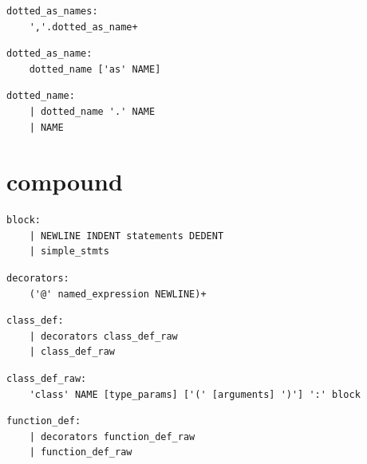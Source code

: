 \noindent\textbf{\texttt{}}\par
\begin{lstlisting}
dotted_as_names:
    ','.dotted_as_name+
\end{lstlisting}

\noindent\textbf{\texttt{}}\par
\begin{lstlisting}
dotted_as_name:
    dotted_name ['as' NAME]
\end{lstlisting}

\noindent\textbf{\texttt{}}\par
\begin{lstlisting}
dotted_name:
    | dotted_name '.' NAME
    | NAME
\end{lstlisting}

\section{compound}

\noindent\textbf{\texttt{}}\par
\begin{lstlisting}
block:
    | NEWLINE INDENT statements DEDENT
    | simple_stmts
\end{lstlisting}

\noindent\textbf{\texttt{}}\par
\begin{lstlisting}
decorators:
    ('@' named_expression NEWLINE)+
\end{lstlisting}

\noindent\textbf{\texttt{}}\par
\begin{lstlisting}
class_def:
    | decorators class_def_raw
    | class_def_raw
\end{lstlisting}

\noindent\textbf{\texttt{}}\par
\begin{lstlisting}
class_def_raw:
    'class' NAME [type_params] ['(' [arguments] ')'] ':' block
\end{lstlisting}

\noindent\textbf{\texttt{}}\par
\begin{lstlisting}
function_def:
    | decorators function_def_raw
    | function_def_raw
\end{lstlisting}

